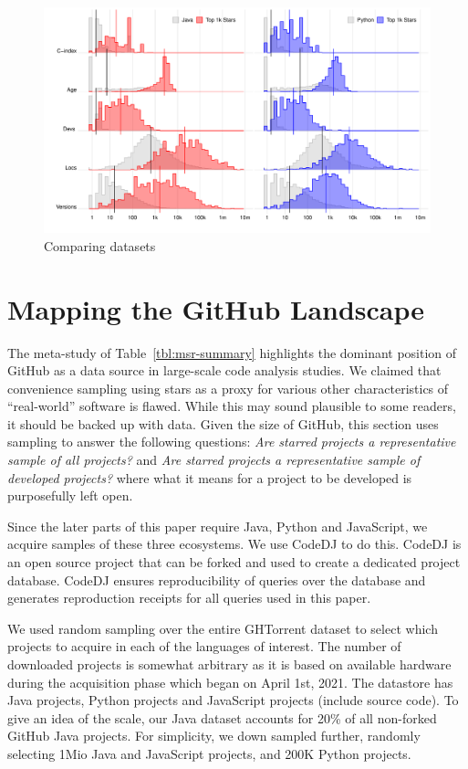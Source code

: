 \documentclass[sigconf,review,anonymous]{acmart}
\newcommand{\gh}{{GitHub}\xspace}
\newcommand{\ght}{{GHTorrent}\xspace}
\renewcommand{\dj}{{\textsf{Code{\small{DJ}}}}\xspace}
\begin{document}
\noindent

\begin{figure}[!t]
    \includegraphics[width=.9\textwidth]{../figs/lang_stars_attributes}
    \caption{Comparing datasets}\label{dataset}
\end{figure}

\section{Mapping the \gh Landscape}

The meta-study of Table~\ref{tbl:msr-summary} highlights the dominant position
of \gh as a data source in large-scale code analysis studies. We claimed that
convenience sampling using stars as a proxy for various other characteristics of
``real-world'' software is flawed. While this may sound plausible to some
readers, it should be backed up with data. Given the size of \gh, this section
uses sampling to answer the following questions: {\it Are starred projects a
  representative sample of all projects?} and {\it Are starred projects a
  representative sample of developed projects?} where what it means for a
project to be developed is purposefully left open.

Since the later parts of this paper require Java, Python and JavaScript, we
acquire samples of these three ecosystems. We use \dj to do this. \dj is an open
source project that can be forked and used to create a dedicated project
database. \dj ensures reproducibility of queries over the database and generates
reproduction receipts for all queries used in this paper.

We used random sampling over the entire \ght dataset to select which
projects to acquire in each of the languages of interest. The number of
downloaded projects is somewhat arbitrary as it is based on available hardware
during the acquisition phase which began on April 1st, 2021. The datastore has
\javaActualProjects Java projects, \pythonActualProjects Python projects and
\jsActualProjects JavaScript projects (include source code). To give an idea of
the scale, our Java dataset accounts for 20\% of all non-forked \gh Java
projects. For simplicity, we down sampled further, randomly selecting 1Mio Java
and JavaScript projects, and 200K Python projects.
\end{document}
